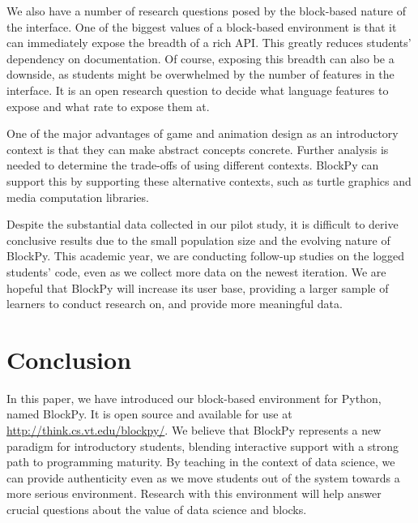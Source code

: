 \documentclass{sig-alternate}
\begin{document}
We also have a number of research questions posed by the block-based nature of the interface.
One of the biggest values of a block-based environment is that it can immediately expose the breadth of a rich API.
This greatly reduces students' dependency on documentation.
Of course, exposing this breadth can also be a downside, as students might be overwhelmed by the number of features in the interface.
It is an open research question to decide what language features to expose and what rate to expose them at.

One of the major advantages of game and animation design as an introductory context is that they can make abstract concepts concrete. 
Further analysis is needed to determine the trade-offs of using different contexts.
BlockPy can support this by supporting these alternative contexts, such as turtle graphics and media computation libraries.

Despite the substantial data collected in our pilot study, it is difficult to derive conclusive results due to the small population size and the evolving nature of BlockPy.
This academic year, we are conducting follow-up studies on the logged students' code, even as we collect more data on the newest iteration.
We are hopeful that BlockPy will increase its user base, providing a larger sample of learners to conduct research on, and provide more meaningful data.

\section{Conclusion}
In this paper, we have introduced our block-based environment for Python, named BlockPy.
It is open source and available for use at \url{http://think.cs.vt.edu/blockpy/}.
We believe that BlockPy represents a new paradigm for introductory students, blending interactive support with a strong path to programming maturity.
By teaching in the context of data science, we can provide authenticity even as we move students out of the system towards a more serious environment. 
Research with this environment will help answer crucial questions about the value of data science and blocks.



 
\end{document}
